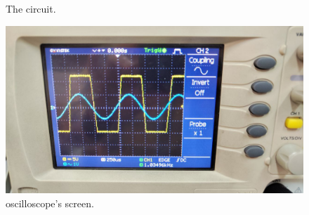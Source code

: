 \documentclass[11pt]{article}
\newcommand{\PicScale}{0.2}
\begin{document}
\begin{question}
\begin{subquestion}
{\begin{figure}[H]
                \caption{The circuit.}
            \end{figure}
            \begin{figure}[H]
                \centering
                \includegraphics[scale=\PicScale,angle=0]{Fig/4.jpeg}
                \caption{oscilloscope's screen.}
            \end{figure}
        }
    \end{subquestion}


\end{question}
\end{document}
